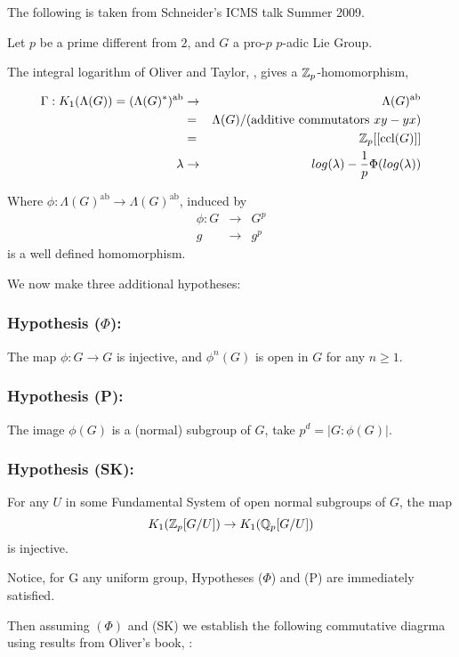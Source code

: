 The following is taken from Schneider's ICMS talk Summer 2009.

Let $p$ be a prime different from $2$, and $G$ a pro-$p$ $p$-adic Lie Group.

The integral logarithm of Oliver and Taylor, \cite{taylor1984cgr}, gives a $\mathbb Z_p$-homomorphism,

\begin{eqnarray}
\nonumber \Gamma: K_1(\Lambda (G)) = (\Lambda(G)^*)^{\text{ab}} &\rightarrow& \Lambda(G)^{\text{ab}}\\
\nonumber										           &=& \Lambda(G)/(\text{additive commutators }xy-yx)\\
\nonumber										          &=& \mathbb Z_p [[\text{ccl(} G)]]\\
\nonumber     \lambda					                                      &\rightarrow& log(\lambda) - \frac{1}{p} \Phi(log(\lambda))
\end{eqnarray}

Where $\phi:  \Lambda(G)^{\text{ab}} \rightarrow  \Lambda(G)^{\text{ab}}$, induced by 
\begin{eqnarray}
\nonumber \phi: G &\rightarrow& G^p\\ 
\nonumber         g &\rightarrow& g^p
\end{eqnarray}
is a well defined homomorphism.

We now make three additional hypotheses:

\subsubsection*{Hypothesis ($\Phi$):}
The map $\phi:G\rightarrow G$ is injective, and $\phi^n(G)$ is open in $G$ for any $n\geq 1$.

\subsubsection*{Hypothesis (P):}
The image $\phi(G)$ is a (normal) subgroup of $G$, take $p^d = \vert G : \phi(G) \vert$.
\subsubsection*{Hypothesis (SK):}
For any $U$ in some Fundamental System of open normal subgroups of $G$, the map
$$K_1(\mathbb Z_p[G/U]) \rightarrow K_1(\mathbb Q_p[G/U])$$
is injective.

Notice, for G any uniform group, Hypotheses ($\Phi$) and (P) are immediately satisfied.

Then assuming $(\Phi)$ and (SK) we establish the following commutative diagrma using results from Oliver's book, \cite{oliverwhitehead}:

